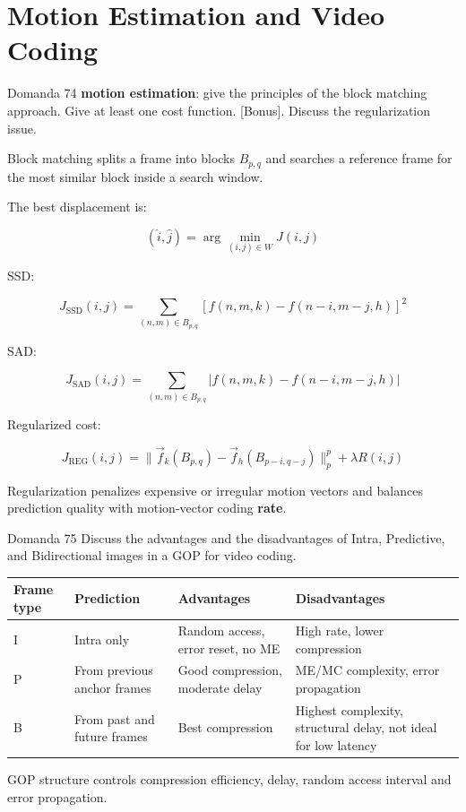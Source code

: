 \section{Motion Estimation and Video Coding}




\begin{questionbox}{Domanda 74}
\textbf{motion estimation}: give the principles of the block matching approach. Give at least one cost function. [Bonus]. Discuss the regularization issue.
\end{questionbox}


Block matching splits a frame into blocks $B_{p,q}$ and searches a reference frame for the most similar block inside a search window.

The best displacement is:


$$
(\hat{i},\hat{j})=\arg\min_{(i,j)\in W}J(i,j)
$$


SSD:


$$
J_{\text{SSD}}(i,j)=
\sum_{(n,m)\in B_{p,q}}
[f(n,m,k)-f(n-i,m-j,h)]^2
$$


SAD:


$$
J_{\text{SAD}}(i,j)=
\sum_{(n,m)\in B_{p,q}}
|f(n,m,k)-f(n-i,m-j,h)|
$$


Regularized cost:


$$
J_{\text{REG}}(i,j)=
\|\vec{f}_k(B_{p,q})-\vec{f}_h(B_{p-i,q-j})\|_p^p
+\lambda R(i,j)
$$


Regularization penalizes expensive or irregular motion vectors and balances prediction quality with motion-vector coding \textbf{rate}.



\begin{questionbox}{Domanda 75}
Discuss the advantages and the disadvantages of Intra, Predictive, and Bidirectional images in a GOP for video coding.
\end{questionbox}



\begin{center}
\begin{tabular}{ | l | l | l | l | }
\hline
\textbf{Frame type} & \textbf{Prediction} & \textbf{Advantages} & \textbf{Disadvantages} \\
\hline
I & Intra only & Random access, error reset, no ME & High rate, lower compression \\
\hline
P & From previous anchor frames & Good compression, moderate delay & ME/MC complexity, error propagation \\
\hline
B & From past and future frames & Best compression & Highest complexity, structural delay, not ideal for low latency \\
\hline
\end{tabular}
\end{center}
GOP structure controls compression efficiency, delay, random access interval and error propagation.



